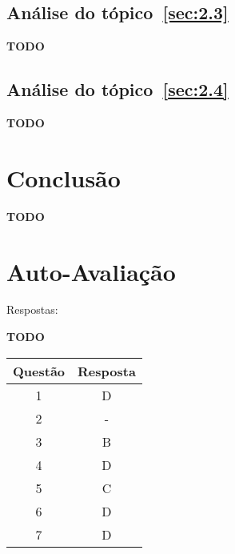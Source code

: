 \documentclass[12pt]{article}
\begin{document}
\subsection{Análise do tópico~\ref{sec:2.3}}\label{sec:analise2.3}

\textbf{TODO}

\subsection{Análise do tópico~\ref{sec:2.4}}\label{sec:analise2.4}

\textbf{TODO}

\section{Conclusão}\label{sec:Conclusao}

\textbf{TODO}

\nocite{*}



\newpage
\section*{Auto-Avaliação}

Respostas:

\textbf{TODO}

\begin{table}[H]
      \begin{tabular}{|c|c|} \hline
      \textbf{Questão} & \textbf{Resposta}\\
      \hline
      1  & D \\ \hline
      2  & - \\ \hline
      3  & B \\ \hline
      4  & D \\ \hline
      5  & C \\ \hline
      6  & D \\ \hline
      7  & D \\ \hline
      \end{tabular}
\end{table}
\end{document}
